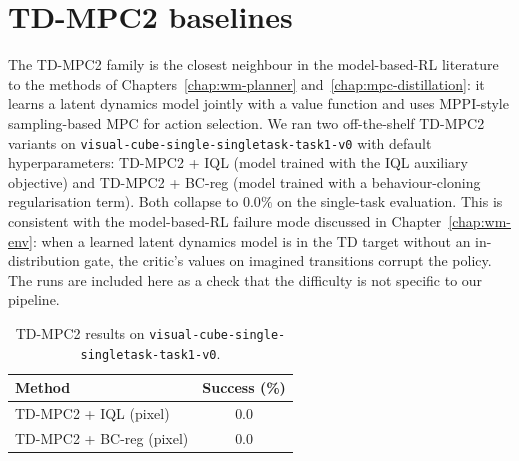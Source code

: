 
\chapter{TD-MPC2 baselines}
\label{app:tdmpc2-baselines}

The TD-MPC2 family \cite{hansen2024tdmpc2} is the closest neighbour
in the model-based-RL literature to the methods of
Chapters~\ref{chap:wm-planner} and~\ref{chap:mpc-distillation}: it
learns a latent dynamics
model jointly with a value function and uses MPPI-style
sampling-based MPC for action selection. We ran two off-the-shelf
TD-MPC2 variants on
\texttt{visual-cube-single-singletask-task1-v0} with default
hyperparameters: TD-MPC2 + IQL (model trained with the IQL
auxiliary objective) and TD-MPC2 + BC-reg (model trained with a
behaviour-cloning regularisation term). Both collapse to $0.0\%$
on the single-task evaluation. This is consistent with the
model-based-RL failure mode discussed in
Chapter~\ref{chap:wm-env}: when a learned latent dynamics
model is in the TD target without an in-distribution gate, the
critic's values on imagined transitions corrupt the policy. The
runs are included here as a check that the difficulty is not
specific to our pipeline.

\begin{table}[h]
\centering
\caption{TD-MPC2 results on
\texttt{visual-cube-single-singletask-task1-v0}.}
\label{tab:tdmpc2}
\begin{tabular}{lc}
\toprule
Method & Success (\%) \\
\midrule
TD-MPC2 + IQL (pixel)     & 0.0 \\
TD-MPC2 + BC-reg (pixel)  & 0.0 \\
\bottomrule
\end{tabular}
\end{table}

